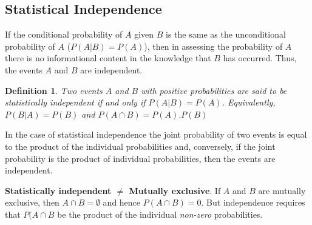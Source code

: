 \documentclass{article}
\newtheorem{definition}{Definition}[section]
\begin{document}
\subsection{Statistical Independence}
If the conditional probability of \(A\) given \(B\) is the same as the unconditional probability of \(A\) (\(P(A|B)=P(A)\)), then in assessing the probability of \(A\) there is no informational content in the knowledge that \(B\) has occurred. Thus, the events \(A\) and \(B\) are independent.
\begin{definition}
    Two events \(A\) and \(B\) with positive probabilities are said to be statistically independent if and only if \(P(A|B)=P(A)\). Equivalently, \(P(B|A)=P(B)\) and \(P(A \cap B) = P(A).P(B)\)
\end{definition}
In the case of statistical independence the joint probability of two events is equal to the product of the individual probabilities and, conversely, if the joint probability is the product of individual probabilities, then the events are independent.

\textbf{Statistically independent $\neq$ Mutually exclusive}. If \(A\) and \(B\) are mutually exclusive, then \(A \cap B = \emptyset\) and hence \(P(A \cap B)=0\). But independence requires that \(P(A \cap B\) be the product of the individual \textit{non-zero} probabilities.
\end{document}
